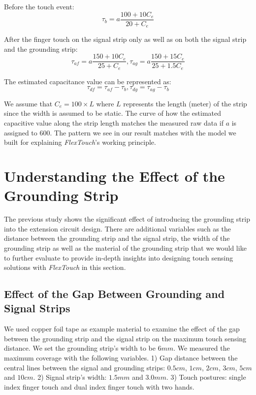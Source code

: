Before the touch event:
\begin{equation}
    \tau_{b} = a\frac{100 + 10C_{e}}{20+C_{e}}
\end{equation}

After the finger touch on the signal strip only as well as on both the signal strip and the grounding strip: 
\begin{equation}
    \tau_{af} = a\frac{150 + 10C_{e}}{25+C_{e}}, \tau_{ag} = a\frac{150 + 15C_{e}}{25+1.5C_{e}}
\end{equation}

The estimated capacitance value can be represented as:
\begin{equation}
    \tau_{df} = \tau_{af} - \tau_{b},  \tau_{dg} = \tau_{ag} - \tau_{b}
\end{equation}

We assume that $C_{e} = 100 \times L$ where $L$ represents the length (meter) of the strip since the width is assumed to be static. The curve of how the estimated capacitive value along the strip length matches the measured raw data if $a$ is assigned to 600. The pattern we see in our result matches with the model we built for explaining \textit{FlexTouch}'s working principle. 

\section{Understanding the Effect of the Grounding Strip}
The previous study shows the significant effect of introducing the grounding strip into the extension circuit design. There are additional variables such as the distance between the grounding strip and the signal strip, the width of the grounding strip as well as the material of the grounding strip that we would like to further evaluate to provide in-depth insights into designing touch sensing solutions with \textit{FlexTouch} in this section.

\subsection{Effect of the Gap Between Grounding and Signal Strips}

We used copper foil tape as example material to examine the effect of the gap between the grounding strip and the signal strip on the maximum touch sensing distance. We set the grounding strip's width to be $6 mm$. We measured the maximum coverage with the following variables. 1) Gap distance between the central lines between the signal and grounding strips: $0.5 cm$,  $1 cm$, $2 cm$, $3 cm$, $5 cm$ and $10 cm$. 2) Signal strip's width: $1.5 mm$ and $3.0 mm$. 3) Touch postures: single index finger touch and dual index finger touch with two hands.


